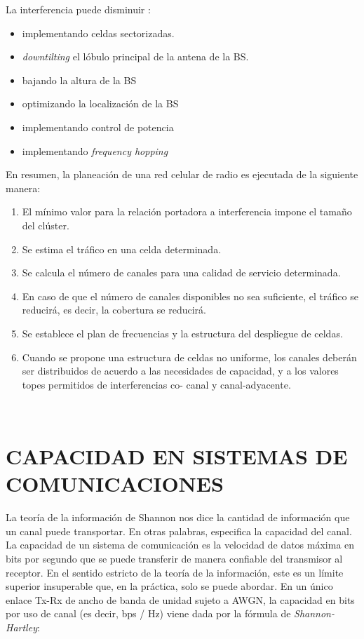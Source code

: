 La interferencia puede disminuir \parencite{Correia2018}:
\begin{itemize}
    \item implementando celdas sectorizadas.
    \item \textit{downtilting} el lóbulo principal de la antena de la BS.
    \item bajando la altura de la BS
    \item optimizando la localización de la BS
    \item implementando control de potencia
    \item implementando \textit{frequency hopping }
\end{itemize}

En resumen, la planeación de una red celular de radio es ejecutada de la siguiente manera:\newline
\begin{enumerate}
    \item El mínimo valor para la relación portadora a interferencia impone el tamaño del clúster.
    \item Se estima el tráfico en una celda determinada.
    \item Se calcula el número de canales para una calidad de servicio determinada.
    \item En caso de que el número de canales disponibles no sea suficiente, el tráfico se reducirá, es decir, la cobertura se reducirá.
    \item Se establece el plan de frecuencias y la estructura del despliegue de celdas.
    \item Cuando se propone una estructura de celdas no uniforme, los canales deberán ser distribuidos de acuerdo a las necesidades de capacidad, y a los valores topes permitidos de interferencias co- canal y canal-adyacente.
\end{enumerate}\



\section{CAPACIDAD EN SISTEMAS DE COMUNICACIONES}

La teoría de la información de Shannon nos dice la cantidad de información que un canal puede transportar. En otras palabras, especifica la capacidad del canal. La capacidad de un sistema de comunicación es la velocidad de datos máxima en bits por segundo que se puede transferir de manera confiable del transmisor al receptor. En el sentido estricto de la teoría de la información, este es un límite superior insuperable que, en la práctica, solo se puede abordar. En un único enlace Tx-Rx de ancho de banda de unidad sujeto a AWGN, la capacidad en bits por uso de canal (es decir, bps / Hz) viene dada por la fórmula de \emph{Shannon-Hartley}:\newline


